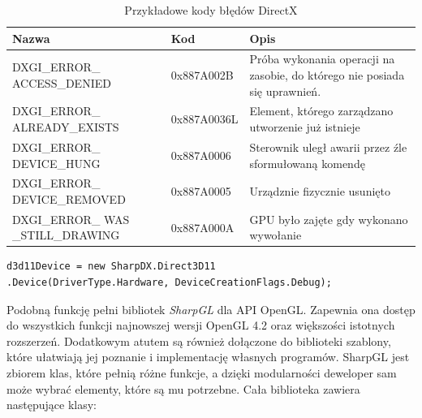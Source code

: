 \documentclass[archive]{mgr}
\begin{document}
\begin{table}[!h]

    \centering 
    \caption{Przykładowe kody błędów DirectX}
    		\label{lab:dxerrors}
    \vspace{2mm} 
\begin{tabular}{|p{4.6cm}|p{2.5cm}|p{7cm}|}
\hline

\textbf{Nazwa} &	\textbf{Kod}	&\textbf{Opis}\\ \hline

DXGI\_ERROR\_
ACCESS\_DENIED &0x887A002B& Próba wykonania operacji na zasobie, do którego nie posiada się uprawnień.\\ \hline
DXGI\_ERROR\_
ALREADY\_EXISTS &0x887A0036L &Element, którego zarządzano utworzenie już istnieje\\ \hline
DXGI\_ERROR\_
DEVICE\_HUNG &0x887A0006 & Sterownik uległ awarii przez źle sformułowaną komendę\\ \hline
DXGI\_ERROR\_
DEVICE\_REMOVED & 0x887A0005& Urządznie fizycznie usunięto\\ \hline
DXGI\_ERROR\_
WAS \_STILL\_DRAWING & 0x887A000A & GPU było zajęte gdy wykonano wywołanie\\ \hline

\end{tabular}
\end{table}
\begin{lstlisting}[caption={SharpDX – aktywowanie trybu debugowania},captionpos=b,label={lab:sharpdxdebug}]
d3d11Device = new SharpDX.Direct3D11
.Device(DriverType.Hardware, DeviceCreationFlags.Debug);
\end{lstlisting}

Podobną funkcję pełni bibliotek \emph{SharpGL} dla API OpenGL. Zapewnia ona dostęp do wszystkich funkcji najnowszej wersji OpenGL 4.2 oraz większości istotnych rozszerzeń. Dodatkowym atutem są również dołączone do biblioteki szablony, które ułatwiają jej poznanie i implementację własnych programów. SharpGL jest zbiorem klas, które pełnią różne funkcje, a dzięki modularności deweloper sam może wybrać elementy, które są mu potrzebne. Cała biblioteka zawiera następujące klasy:
\end{document}
